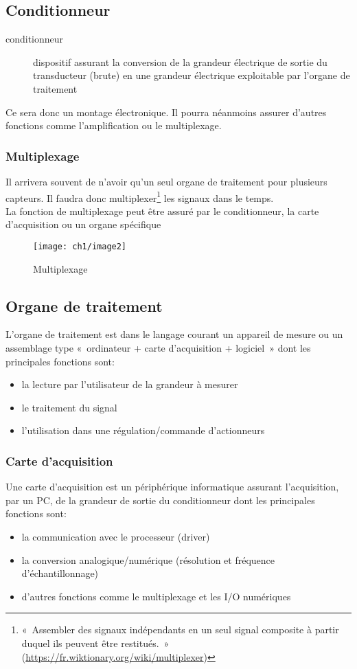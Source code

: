 \subsection{Conditionneur}
\begin{description}
	\item[conditionneur] dispositif assurant la conversion de la grandeur électrique de sortie du transducteur (brute) en une grandeur électrique exploitable par l'organe de traitement
\end{description}
Ce sera donc un montage électronique. Il pourra néanmoins assurer d'autres fonctions comme l'amplification ou le multiplexage.
\subsubsection{Multiplexage}
Il arrivera souvent de n'avoir qu'un seul organe de traitement pour plusieurs capteurs. Il faudra donc multiplexer\footnote{«~Assembler des signaux indépendants en un seul signal composite à partir duquel ils peuvent être restitués.~» (\url{https://fr.wiktionary.org/wiki/multiplexer})} les signaux dans le temps.\\
La fonction de multiplexage peut être assuré par le conditionneur, la carte d'acquisition ou un organe spécifique
\begin{figure}[H] 
	\centering 
	\texttt{[image: ch1/image2]}
	\caption{Multiplexage}
\end{figure}
\subsection{Organe de traitement}
L'organe de traitement est dans le langage courant un appareil de mesure ou un assemblage type «~ordinateur + carte d'acquisition + logiciel~» dont les principales fonctions sont:
\begin{itemize}
	\item la lecture par l'utilisateur de la grandeur à mesurer
	\item le traitement du signal
	\item l'utilisation dans une régulation/commande
	d'actionneurs
\end{itemize}
\subsubsection{Carte d'acquisition}
Une carte d'acquisition est un périphérique informatique assurant l'acquisition, par un PC, de la grandeur de sortie du conditionneur dont les principales fonctions sont:
\begin{itemize}
	\item la communication avec le processeur (driver)
	\item la conversion analogique/numérique (résolution et fréquence d’échantillonnage)
	\item d'autres fonctions comme le multiplexage et les I/O numériques
\end{itemize}
